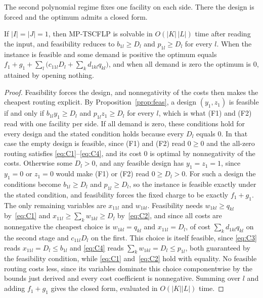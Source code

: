 The second polynomial regime fixes one facility on each side. There the
design is forced and the optimum admits a closed form.

\begin{proposition}\label{prop:onebyone}
If $|I|=|J|=1$, then MP-TSCFLP is solvable in $O(|K|\,|L|)$ time after
reading the input, and feasibility reduces to $b_{1l}\ge D_l$ and
$p_{1l}\ge D_l$ for every $l$. When the instance is feasible and some
demand is positive the optimum equals
$f_1+g_1+\sum_{l}\bigl(c_{11l}D_l+\sum_k d_{1kl}q_{kl}\bigr)$, and when all
demand is zero the optimum is $0$, attained by opening nothing.
\end{proposition}
\begin{proof}
Feasibility forces the design, and nonnegativity of the costs then
makes the cheapest routing explicit. By
Proposition~\ref{prop:feas}, a design $(y_1,z_1)$
is feasible if and only if $b_{1l}y_1\ge D_l$ and $p_{1l}z_1\ge D_l$ for
every $l$, which is what (F1) and (F2) read with one facility per side.
If all demand is zero, these conditions hold for every design and the
stated condition holds because every $D_l$ equals $0$. In that case the
empty design is feasible, since (F1) and (F2) read $0\ge 0$ and the
all-zero routing satisfies \eqref{eq:C1}--\eqref{eq:C4}, and its cost $0$
is optimal by nonnegativity of the costs. Otherwise some $D_l>0$, and
any feasible design has $y_1=z_1=1$, since $y_1=0$ or $z_1=0$ would make
(F1) or (F2) read $0\ge D_l>0$. For such a design the conditions become
$b_{1l}\ge D_l$ and $p_{1l}\ge D_l$, so the instance is feasible exactly
under the stated condition, and feasibility forces the fixed charge to be
exactly $f_1+g_1$. The only remaining variables are $x_{11l}$ and
$w_{1kl}$. Feasibility needs $w_{1kl}\ge q_{kl}$ by~\eqref{eq:C1} and
$x_{11l}\ge\sum_k w_{1kl}\ge D_l$ by~\eqref{eq:C2}, and since all costs
are nonnegative the cheapest choice is $w_{1kl}=q_{kl}$ and
$x_{11l}=D_l$, of cost $\sum_k d_{1kl}q_{kl}$ on the second stage and
$c_{11l}D_l$ on the first. This choice is itself feasible, since
\eqref{eq:C3} reads $x_{11l}=D_l\le b_{1l}$ and \eqref{eq:C4} reads
$\sum_k w_{1kl}=D_l\le p_{1l}$, both guaranteed by the feasibility
condition, while \eqref{eq:C1} and~\eqref{eq:C2} hold with equality. No
feasible routing costs less, since its variables dominate this choice
componentwise by the bounds just derived and every cost coefficient is
nonnegative. Summing over $l$ and adding $f_1+g_1$ gives the closed
form, evaluated in $O(|K||L|)$ time.
\end{proof}

